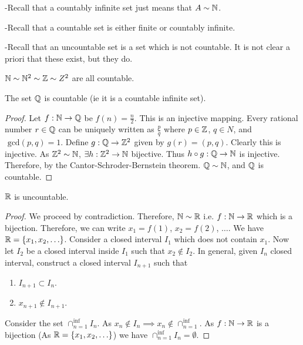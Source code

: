 
-Recall that a countably infinite set just means that $A \sim \mathbb{N}$.

-Recall that a countable set is either finite or countably infinite.

-Recall that an uncountable set is a set which is not countable. It is not clear a priori that these exist, but they do.

\begin{eg}
	$\mathbb{N} \sim \mathbb{N}^{2} \sim \mathbb{Z} \sim Z^{2}$ are all countable.
\end{eg}

\begin{theorem}
	The set $\mathbb{Q}$ is countable (ie it is a countable infinite set).
\end{theorem}

\begin{proof}
	Let $f: \mathbb{N} \to \mathbb{Q}$ be $f\left( n \right) = \frac{n}{2}$. This is an injective mapping. Every rational number $r \in \mathbb{Q}$ can be uniquely written as $\frac{p}{q} $ where $p \in \mathbb{Z}$, $q \in N$, and  $\text{ gcd}\left( p, q \right) = 1$. Define $g: \mathbb{Q} \to \mathbb{Z}^{2}$ given by $g\left( r \right) = \left( p, q \right) $. Clearly this is injective. As $\mathbb{Z}^{2} \sim \mathbb{N}$, $\exists h: \mathbb{Z}^{2} \to \mathbb{N}$ bijective. Thus $h \circ g: \mathbb{Q} \to \mathbb{N}$ is injective. Therefore, by the Cantor-Schroder-Bernstein theorem. $\mathbb{Q} \sim \mathbb{N}$, and $\mathbb{Q}$ is countable.
\end{proof}

\begin{theorem}
	$\mathbb{R}$ is uncountable.
\end{theorem}

\begin{proof}
	We proceed by contradiction. Therefore, $\mathbb{N} \sim \mathbb{R}$ i.e. $f: \mathbb{N} \to \mathbb{R}$ which is a bijection. Therefore, we can write $x_1 = f\left( 1 \right)$, $x_2 = f\left( 2 \right) $, $\ldots$. We have $\mathbb{R} = \{x_1, x_2, \ldots\}$. Consider a closed interval $I_1$ which does not contain $x_1$. Now let $I_2$ be a closed interval inside $I_1$ such that $x_2 \notin  I_2$. In general, given $I_n$ closed interval, construct a closed interval  $I_{n+1}$ such that
	\begin{enumerate}
		\item $I_{n+1} \subset I_n$.
		\item $x_{n+1} \notin I_{n+1}$.
	\end{enumerate}

	Consider the set $\cap_{n=1}^{\inf} I_n$. As $x_n \notin I_n \implies x_n \notin \cap_{n=1}^{\inf}$. As $f: \mathbb{N} \to \mathbb{R}$ is a bijection (As $\mathbb{R} = \{x_1, x_2, \ldots\}$) we have $\cap_{n=1}^{\inf} I_n = \emptyset$.
\end{proof}


